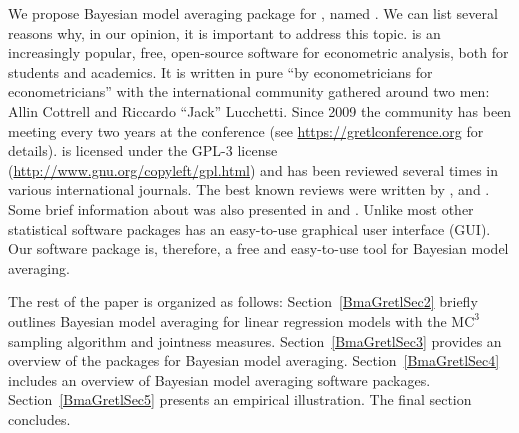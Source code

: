 We propose Bayesian model averaging package for
, \citep{cottrell_luchcetti_gretl_manual} named .
We can list several reasons why, in our opinion, it is important to
address this topic.  is
an increasingly popular, free, open-source software for econometric
analysis, both for students and academics. It is written in pure
 ``by econometricians for econometricians'' with the
international community gathered around two men: Allin Cottrell and
Riccardo ``Jack'' Lucchetti. Since 2009 the community has been meeting
every two years at the  conference (see
\url{https://gretlconference.org} for details).  is
licensed under the GPL-3 license (\url{http://www.gnu.org/copyleft/gpl.html})
and has been reviewed several times in various international journals.
The best known reviews were written by
\cite{RePEc:jae:japmet:v:18:y:2003:i:1:p:105-110},
\cite{RePEc:jae:japmet:v:22:y:2007:i:4:p:849-854} and
\cite{Rosenblad:2008:JSSOBK:v25s01}. Some brief information about
 was also presented in \cite{Lucchetti:2010:JSSOBK:v41i11} and
\cite{RePEc:wly:japmet:v:26:y:2011:i:5:p:880-885}.  Unlike most other
statistical software packages  has an easy-to-use graphical user
interface (GUI). Our software package is, therefore, a free and
easy-to-use tool for Bayesian model averaging.

The rest of the paper is organized as follows:
Section~\ref{BmaGretlSec2} briefly outlines Bayesian model averaging
for linear regression models with the $\mbox{MC}^3$ sampling algorithm and
jointness measures.  Section~\ref{BmaGretlSec3} provides an overview
of the  packages for Bayesian model averaging.
Section~\ref{BmaGretlSec4} includes an overview of Bayesian model
averaging software packages.  Section~\ref{BmaGretlSec5} presents
an empirical illustration. The final section concludes. 
